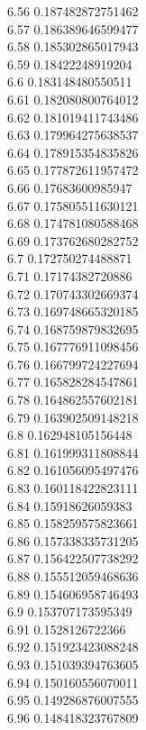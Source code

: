 {6.56	0.187482872751462\\
6.57	0.186389646599477\\
6.58	0.185302865017943\\
6.59	0.18422248919204\\
6.6	0.183148480550511\\
6.61	0.182080800764012\\
6.62	0.181019411743486\\
6.63	0.179964275638537\\
6.64	0.178915354835826\\
6.65	0.177872611957472\\
6.66	0.17683600985947\\
6.67	0.175805511630121\\
6.68	0.174781080588468\\
6.69	0.173762680282752\\
6.7	0.172750274488871\\
6.71	0.17174382720886\\
6.72	0.170743302669374\\
6.73	0.169748665320185\\
6.74	0.168759879832695\\
6.75	0.167776911098456\\
6.76	0.166799724227694\\
6.77	0.165828284547861\\
6.78	0.164862557602181\\
6.79	0.163902509148218\\
6.8	0.162948105156448\\
6.81	0.161999311808844\\
6.82	0.161056095497476\\
6.83	0.160118422823111\\
6.84	0.15918626059383\\
6.85	0.158259575823661\\
6.86	0.157338335731205\\
6.87	0.156422507738292\\
6.88	0.155512059468636\\
6.89	0.154606958746493\\
6.9	0.153707173595349\\
6.91	0.1528126722366\\
6.92	0.151923423088248\\
6.93	0.151039394763605\\
6.94	0.150160556070011\\
6.95	0.149286876007555\\
6.96	0.148418323767809\\
}
